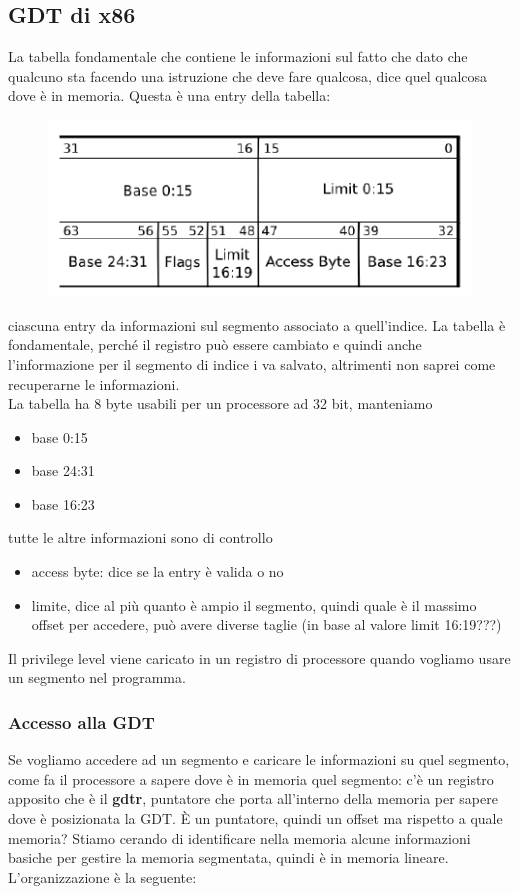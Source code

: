 \documentclass[12pt, oneside]{extbook}
\begin{document}
\subsection{GDT di x86}
La tabella fondamentale che contiene le informazioni sul fatto che dato che qualcuno sta facendo una istruzione che deve fare qualcosa, dice quel qualcosa dove è in memoria. Questa è una entry della tabella:
\begin{figure}[!h]
	\includegraphics[scale=0.5]{immagini/gdt_entry.png}
\end{figure}
ciascuna entry da informazioni sul segmento associato a quell'indice. La tabella è fondamentale, perché il registro può essere cambiato e quindi anche l'informazione per il segmento di indice i va salvato, altrimenti non saprei come recuperarne le informazioni.\\ La tabella ha 8 byte usabili per un processore ad 32 bit, manteniamo
\begin{itemize}
\item base 0:15
\item base 24:31
\item base 16:23
\end{itemize}
tutte le altre informazioni sono di controllo
\begin{itemize}
\item access byte: dice se la entry è valida o no
\item limite, dice al  più quanto è ampio il segmento, quindi quale è il massimo offset per accedere, può avere diverse taglie (in base al valore limit 16:19???)
\end{itemize}
Il privilege level viene caricato in un registro di processore quando vogliamo usare un segmento nel programma.
\subsubsection{Accesso alla GDT}
Se vogliamo accedere ad un segmento e caricare le informazioni su quel segmento, come fa il processore a sapere dove è in memoria quel segmento: c'è un registro apposito che è il \textbf{gdtr}, puntatore che porta all'interno della memoria per sapere dove è posizionata la GDT. È un puntatore, quindi un offset ma rispetto a quale memoria? Stiamo cerando di identificare nella memoria alcune informazioni basiche per gestire la memoria segmentata, quindi è in memoria lineare. L'organizzazione è la seguente:
\end{document}
